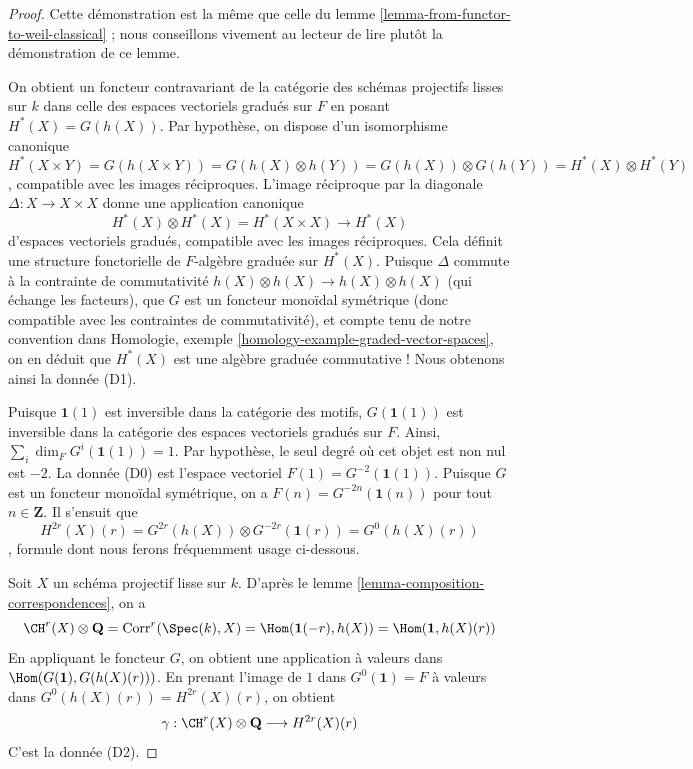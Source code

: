 \begin{proof}
Cette démonstration est la même que celle du
lemme \ref{lemma-from-functor-to-weil-classical} ;
nous conseillons vivement au lecteur de lire plutôt la démonstration de ce lemme.

\medskip\noindent
On obtient un foncteur contravariant de la catégorie des schémas projectifs
lisses sur $k$ dans celle des espaces vectoriels gradués sur $F$
en posant $H^*(X) = G(h(X))$. Par hypothèse, on dispose d'un isomorphisme
canonique
$$
H^*(X \times Y) = G(h(X \times Y)) = G(h(X) \otimes h(Y)) =
G(h(X)) \otimes G(h(Y)) = H^*(X) \otimes H^*(Y)
$$,
compatible avec les images réciproques. L'image réciproque par la diagonale
$\Delta : X \to X \times X$ donne une application canonique
$$
H^*(X) \otimes H^*(X) = H^*(X \times X) \to H^*(X)
$$
d'espaces vectoriels gradués, compatible avec les images réciproques.
Cela définit une structure fonctorielle de $F$-algèbre graduée sur
$H^*(X)$. Puisque $\Delta$ commute à la contrainte de commutativité
$h(X) \otimes h(X) \to h(X) \otimes h(X)$ (qui échange les facteurs),
que $G$ est un foncteur monoïdal symétrique (donc compatible avec
les contraintes de commutativité), et compte tenu de notre convention dans
Homologie, exemple \ref{homology-example-graded-vector-spaces},
on en déduit que $H^*(X)$ est une algèbre graduée
commutative ! Nous obtenons ainsi la donnée (D1).

\medskip\noindent
Puisque $\mathbf{1}(1)$ est inversible dans la catégorie des motifs,
$G(\mathbf{1}(1))$ est inversible dans la catégorie des
espaces vectoriels gradués sur $F$. Ainsi, $\sum_i \dim_F G^i(\mathbf{1}(1)) = 1$.
Par hypothèse, le seul degré où cet objet est non nul est $-2$.
La donnée (D0) est l'espace vectoriel $F(1) = G^{-2}(\mathbf{1}(1))$.
Puisque $G$ est un foncteur monoïdal symétrique,
on a $F(n) = G^{-2n}(\mathbf{1}(n))$ pour tout $n \in \mathbf{Z}$.
Il s'ensuit que
$$
H^{2r}(X)(r) = G^{2r}(h(X)) \otimes G^{-2r}(\mathbf{1}(r)) =
G^0(h(X)(r))
$$,
formule dont nous ferons fréquemment usage ci-dessous.

\medskip\noindent
Soit $X$ un schéma projectif lisse sur $k$. D'après
le lemme \ref{lemma-composition-correspondences}, on a
$$
\CH^r(X) \otimes \mathbf{Q} = \text{Corr}^r(\Spec(k), X) =
\Hom(\mathbf{1}(-r), h(X)) = \Hom(\mathbf{1}, h(X)(r))
$$
En appliquant le foncteur $G$, on obtient une application à valeurs dans
$\Hom(G(\mathbf{1}), G(h(X)(r)))$.
En prenant l'image de $1$ dans $G^0(\mathbf{1}) = F$
à valeurs dans $G^0(h(X)(r)) = H^{2r}(X)(r)$, on obtient
$$
\gamma :
\CH^r(X) \otimes \mathbf{Q} \longrightarrow H^{2r}(X)(r)
$$
C'est la donnée (D2).


\end{proof}
